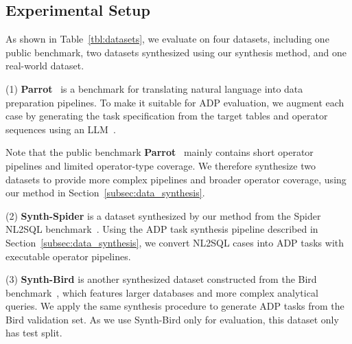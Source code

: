 \subsection{Experimental Setup} 
\label{subsec:exp-setup}

As shown in Table~\ref{tbl:datasets}, we evaluate \sys on four datasets, including one public benchmark, two datasets synthesized using our synthesis method, and one real-world dataset. 

(1) \textbf{Parrot}~\cite{ge2025text} is a benchmark for translating natural language into data preparation pipelines.
To make it suitable for ADP evaluation, we augment each case by generating the task specification from the target tables and operator sequences using an LLM~\cite{doubaoseed}. 

Note that the public benchmark \textbf{Parrot}~\cite{ge2025text} mainly contains short operator pipelines and limited operator-type coverage. We therefore synthesize two datasets to provide more complex pipelines and broader operator coverage, using our method in Section~\ref{subsec:data_synthesis}. 


(2) \textbf{Synth-Spider} is a dataset synthesized by our method from the Spider NL2SQL benchmark~\cite{spider_dataset}. Using the ADP task synthesis pipeline described in Section~\ref{subsec:data_synthesis}, we convert NL2SQL cases into ADP tasks with executable operator pipelines. 

(3) \textbf{Synth-Bird} is another synthesized dataset constructed from the Bird benchmark~\cite{bird_dataset}, which features larger databases and more complex analytical queries. We apply the same synthesis procedure to generate ADP tasks from the Bird validation set.
As we use Synth-Bird only for evaluation, this dataset only has test split. 


